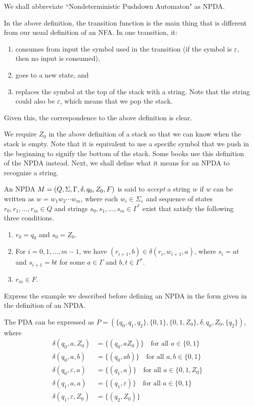 \vspace{2mm}
We shall abbreviate ``Nondeterministic Pushdown Automaton" as NPDA.

In the above definition, the transition function is the main thing that is different from our usual definition of an NFA. In one transition, it:
\begin{enumerate}
    \item consumes from input the symbol used in the transition (if the symbol is $\varepsilon$, then no input is consumed),
    \item goes to a new state, and
    \item replaces the symbol at the top of the stack with a string. Note that the string could also be $\varepsilon$, which means that we pop the stack.
\end{enumerate}
Given this, the correspondence to the above definition is clear.

We require $Z_0$ in the above definition of a stack so that we can know when the stack is empty. Note that it is equivalent to use a specific symbol that we push in the beginning to signify the bottom of the stack. Some books use this definition of the NPDA instead. Next, we shall define what it means for an NPDA to recognize a string.

\begin{definition}
An NPDA $M=(Q,\Sigma,\Gamma,\delta,q_0,Z_0,F)$ is said to \textit{accept} a string $w$ if $w$ can be written as $w=w_1w_2\cdots w_m$, where each $w_i\in\Sigma_\varepsilon$ and sequence of states $r_0,r_1,\ldots,r_m\in Q$ and strings $s_0,s_1,\ldots,s_m\in\Gamma^*$ exist that satisfy the following three conditions.
\begin{enumerate}
    \item $r_0=q_0$ and $s_0=Z_0$.
    \item For $i=0,1,\ldots,m-1$, we have $(r_{i+1},b)\in\delta(r_i,w_{i+1},a)$, where $s_i=at$ and $s_{i+1}=bt$ for some $a\in\Gamma$ and $b,t\in\Gamma^*$.
    \item $r_m\in F$.
\end{enumerate}
\end{definition}

\begin{exercise}
\label{LwwRexercise}
Express the example we described before defining an NPDA in the form given in the definition of an NPDA.
\end{exercise}
\begin{solution}
The PDA can be expressed as $P=(\{q_0,q_1,q_2\}, \{0,1\}, \{0,1,Z_0\}, \delta, q_0,Z_0, \{q_2\})$, where
\begin{align*}
    \delta(q_0,a,Z_0) &= \{(q_0,aZ_0)\}\quad\text{for all $a\in\{0,1\}$} \\
    \delta(q_0,a,b) &= \{(q_0,ab)\}\quad\text{for all $a,b\in\{0,1\}$} \\
    \delta(q_0,\varepsilon,a) &= \{(q_1,a)\}\quad\text{for all $a\in\{0,1,Z_0\}$} \\
    \delta(q_1,a,a) &= \{(q_1,\varepsilon)\}\quad\text{for all $a\in\{0,1\}$} \\
    \delta(q_1,\varepsilon,Z_0) &= \{(q_2,Z_0)\}
\end{align*}
\end{solution}
    
